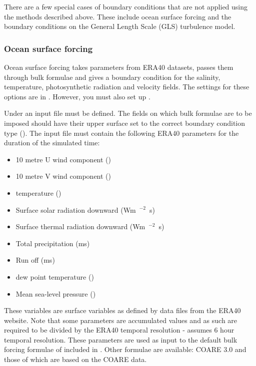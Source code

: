 There are a few special cases of boundary conditions that are not applied
using the methods described above.  These include ocean surface forcing and
the boundary conditions on the General Length Scale (GLS) turbulence model.

\subsubsection{Ocean surface forcing}\label{sec:BCs:special:oceans}

Ocean surface forcing takes parameters from ERA40 datasets, passes them
through bulk formulae and gives a boundary condition for the salinity,
temperature, photosynthetic radiation and velocity fields. The settings for
these options are in . However, you must also set up
.

Under  an input file must be defined. The fields on 
which bulk formulae are to be imposed should have their upper surface set to the correct
boundary condition type ().
The input file must contain the following ERA40 parameters for the
duration of the simulated time:
\begin{itemize}
 \item 10 metre U wind component (\ms)
 \item 10 metre V wind component (\ms)
 \item \m[2] temperature (\K)
 \item Surface solar radiation downward (\unit{Wm\ensuremath{^{-2}}s})
 \item Surface thermal radiation downward (\unit{Wm\ensuremath{^{-2}}s})
 \item Total precipitation (\unit{ms})
 \item Run off (\unit{ms})
 \item \m[2] dew point temperature (\K)
 \item Mean sea-level pressure (\Pa)
\end{itemize}

These variables are surface variables as defined by data files from the ERA40 website. Note that some parameters are accumulated values
and as such are required to be divided by the ERA40 temporal resolution - \fluidity { } assumes 6 hour temporal resolution. 
These parameters are used as input to the default bulk forcing formulae of \citet{large2004} included in \fluidity. Other
formulae are available: COARE 3.0 \citep{fairall2003} and those of \citet{kara2005} which are based on the COARE data.

